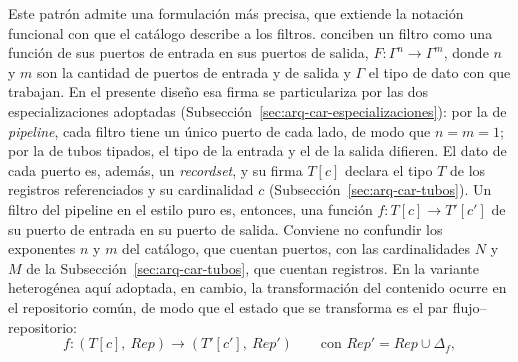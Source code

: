 \documentclass[12pt]{report}
\begin{document}
Este patrón admite una formulación más precisa, que extiende la notación funcional con que el catálogo describe a los filtros. \citet[p.~24]{cristia:2025} conciben un filtro como una función de sus puertos de entrada en sus puertos de salida, \(F : \Gamma^n \to \Gamma^m\), donde \(n\) y \(m\) son la cantidad de puertos de entrada y de salida y \(\Gamma\) el tipo de dato con que trabajan. En el presente diseño esa firma se particulariza por las dos especializaciones adoptadas (Subsección~\ref{sec:arq-car-especializaciones}): por la de \textit{pipeline}, cada filtro tiene un único puerto de cada lado, de modo que \(n = m = 1\); por la de tubos tipados, el tipo de la entrada y el de la salida difieren. El dato de cada puerto es, además, un \textit{recordset}, y su firma \(T[c]\) declara el tipo \(T\) de los registros referenciados y su cardinalidad \(c\) (Subsección~\ref{sec:arq-car-tubos}). Un filtro del pipeline en el estilo puro es, entonces, una función \(f : T[c] \to T'[c']\) de su puerto de entrada en su puerto de salida. Conviene no confundir los exponentes \(n\) y \(m\) del catálogo, que cuentan puertos, con las cardinalidades \(N\) y \(M\) de la Subsección~\ref{sec:arq-car-tubos}, que cuentan registros. En la variante heterogénea aquí adoptada, en cambio, la transformación del contenido ocurre en el repositorio común, de modo que el estado que se transforma es el par flujo--repositorio:
\[
  f : (T[c],\ \mathit{Rep}) \to (T'[c'],\ \mathit{Rep}')
  \qquad \text{con } \mathit{Rep}' = \mathit{Rep} \cup \Delta_f,
\]
\end{document}
